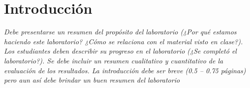 \section{Introducci\' on}

\textit{Debe presentarse un resumen del prop\' osito del laboratorio (¿Por qu\' e estamos haciendo este laboratorio? ¿C\' omo se relaciona con el material visto en clase?). Los estudiantes deben describir su progreso en el laboratorio (¿Se complet\' o el laboratorio?). Se debe incluir un resumen cualitativo y cuantitativo de la evaluaci\' on de los resultados. La introducci\' on debe ser breve (0.5 – 0.75 p\' aginas) pero aun as\' i debe brindar un buen resumen del laboratorio}\\

\setcounter{secnumdepth}{4}

